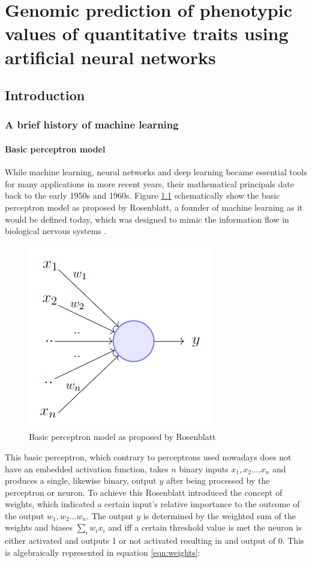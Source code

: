 \chapter{Genomic prediction of phenotypic values of quantitative traits using artificial neural networks}

\label{Chapter3} %


\section{Introduction}
\subsection{A brief history of machine learning} \label{introml}
\subsubsection{Basic perceptron model}

While machine learning, neural networks and deep learning became essential tools for many applications in more
recent years, their mathematical principals date back to the early 1950s and 1960s. Figure
\ref{fig:perceptron} schematically show the basic perceptron model as proposed by Rosenblatt, a founder of
machine learning as it would be defined today,  which was designed to mimic the information flow in biological
nervous systems \cite{rosenblatt1961}.

\begin{figure}[th]
 \centering \includegraphics[height=.25\textheight, width=.5\textwidth]{Figures/perceptron.png} \decoRule
\caption[Basic perceptron model]{Basic perceptron model as proposed by Rosenblatt}
\label{fig:perceptron}
\end{figure}

This basic perceptron, which contrary to perceptrons used nowadays does not have an embedded activation
function, takes $n$ binary inputs $x_1 , x_2 .... x_n$ and produces a single, likewise binary, output $y$
after being processed by the perceptron or neuron. To achieve this Rosenblatt introduced the concept of
weights, which indicated a certain input's relative importance to the outcome of the output $w_1 , w_2 ... w_n$. The
output $y$ is determined by the weighted sum of the weights and biases $\sum_i w_ix_i $ and iff a certain
threshold value is met the neuron is either activated and outputs 1 or not activated resulting in and output
of 0. This is algebraically represented in equation \ref{eqn:weights}:

